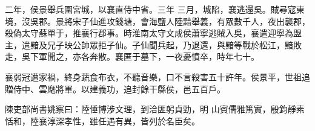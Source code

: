 \begin{pinyinscope}
 二年，侯景舉兵圍宮城，以襄直侍中省。三年
 三月，城陷，襄逃還吳。賊尋寇東境，沒吳郡。景將宋子仙進攻錢塘，會海鹽人陸黯舉義，有眾數千人，夜出襲郡，殺偽太守蘇單于，推襄行郡事。時淮南太守文成侯蕭寧逃賊入吳，襄遣迎寧為盟主，遣黯及兄子映公帥眾拒子仙。子仙聞兵起，乃退還，與黯等戰於松江，黯敗走，吳下軍聞之，亦各奔散。襄匿于墓下，一夜憂憤卒，時年七十。



 襄弱冠遭家禍，終身蔬食布衣，不聽音樂，口不言殺害五十許年。侯景平，世祖追贈侍中、雲麾將軍。以建義功，追封餘干縣侯，邑五百戶。



 陳吏部尚書姚察曰：陸倕博涉文理，到洽匪躬貞勁，明
 山賓儒雅篤實，殷鈞靜素恬和，陸襄淳深孝性，雖任遇有異，皆列於名臣矣。



\end{pinyinscope}